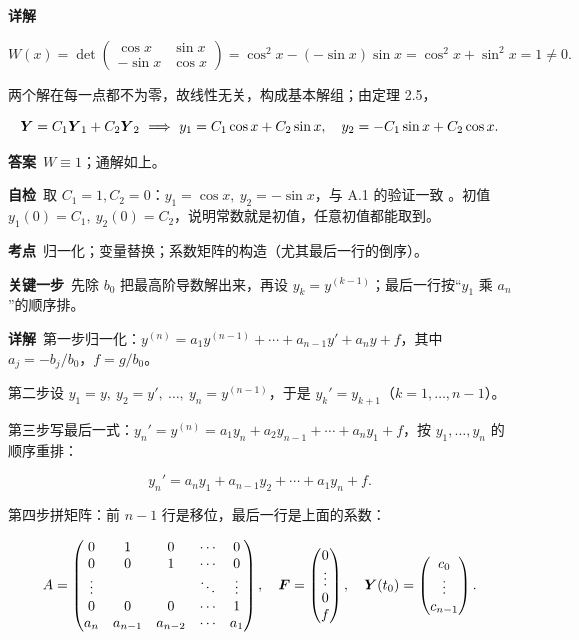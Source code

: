\documentclass[11pt]{ctexart}
\renewcommand{\qbreak}{\needspace{0.26\textheight}}
\newcommand{\qpagebreak}{\needspace{0.92\textheight}}
\newcommand{\mat}[1]{\begin{pmatrix}#1\end{pmatrix}}
\begin{document}
\textbf{详解}\

\[
W(x)=\det\mat{\cos x & \sin x\\ -\sin x & \cos x}
=\cos^2x-(-\sin x)\sin x=\cos^2x+\sin^2x=1\neq0 .
\]

两个解在每一点都不为零，故线性无关，构成基本解组；由定理 2.5，

\[
\boldsymbol{Y}=C_1\boldsymbol{Y}_1+C_2\boldsymbol{Y}_2
\ \Longrightarrow\
y_1=C_1\cos x+C_2\sin x,\quad y_2=-C_1\sin x+C_2\cos x .
\]

\textbf{答案}\ $W\equiv1$；通解如上。

\textbf{自检}\ 取 $C_1=1,C_2=0$：$y_1=\cos x,\ y_2=-\sin x$，与 A.1 的验证一致 。初值 $y_1(0)=C_1,\ y_2(0)=C_2$，说明常数就是初值，任意初值都能取到。

\qpagebreak
{}
\label{app:a6}

\qbreak
{}

\textbf{考点}\ 归一化；变量替换；系数矩阵的构造（尤其最后一行的倒序）。

\textbf{关键一步}\ 先除 $b_0$ 把最高阶导数解出来，再设 $y_k=y^{(k-1)}$；最后一行按“$y_1$ 乘 $a_n$”的顺序排。

\textbf{详解}\ 第一步归一化：$y^{(n)}=a_1y^{(n-1)}+\cdots+a_{n-1}y'+a_ny+f$，其中 $a_j=-b_j/b_0$，$f=g/b_0$。

第二步设 $y_1=y,\ y_2=y',\ \dots,\ y_n=y^{(n-1)}$，于是 $y_k'=y_{k+1}$（$k=1,\dots,n-1$）。

第三步写最后一式：$y_n'=y^{(n)}=a_1y_n+a_2y_{n-1}+\cdots+a_ny_1+f$，按 $y_1,\dots,y_n$ 的顺序重排：

\[
y_n'=a_ny_1+a_{n-1}y_2+\cdots+a_1y_n+f .
\]

第四步拼矩阵：前 $n-1$ 行是移位，最后一行是上面的系数：

\[
A=\begin{pmatrix}
0&1&0&\cdots&0\\
0&0&1&\cdots&0\\
\vdots& & &\ddots&\vdots\\
0&0&0&\cdots&1\\
a_n&a_{n-1}&a_{n-2}&\cdots&a_1
\end{pmatrix},\quad
\vect{F}=\mat{0\\ \vdots\\ 0\\ f},\quad
\vect{Y}(t_0)=\mat{c_0\\ \vdots\\ c_{n-1}}.
\]
\end{document}
